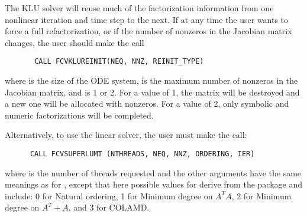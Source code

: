 \begin{Steps}
 The {\cvode} KLU solver will reuse much of the factorization 
 information from one nonlinear iteration and time step to the next.  
 If at any time 
 the user wants to force a full refactorization, or if the number of 
 nonzeros in the Jacobian matrix changes, the user should make the call
\begin{verbatim}
       CALL FCVKLUREINIT(NEQ, NNZ, REINIT_TYPE)
\end{verbatim}
  where  is the size of the ODE system, 
   is the maximum number of nonzeros in the Jacobian matrix,
  and  is 1 or 2.  For a value of 1, the matrix will be 
  destroyed and a new one will be allocated with  nonzeros.  
  For a value of 2, only symbolic and numeric factorizations 
  will be completed. 

  Alternatively, to use the  linear solver,
  the user must make the call:
\begin{verbatim}
      CALL FCVSUPERLUMT (NTHREADS, NEQ, NNZ, ORDERING, IER)
\end{verbatim}
  where  is the number of threads requested and the other 
  arguments have the same meanings as for , except
  that here possible values for  derive from the {\superlumt} 
  package and include: 0 for Natural ordering, 1 for Minimum degree on $A^T A$,
  2 for Minimum degree on $A^T + A$, and 3 for COLAMD.


\end{Steps}
